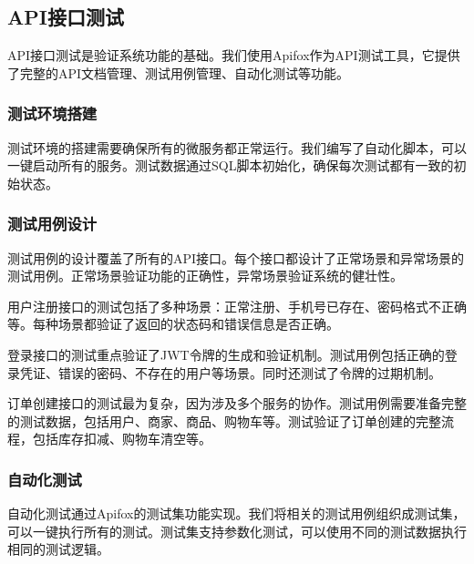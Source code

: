\documentclass[a4paper,12pt]{article}
\begin{document}
\subsection{API接口测试}

API接口测试是验证系统功能的基础。我们使用Apifox作为API测试工具，它提供了完整的API文档管理、测试用例管理、自动化测试等功能。

\subsubsection{测试环境搭建}

测试环境的搭建需要确保所有的微服务都正常运行。我们编写了自动化脚本，可以一键启动所有的服务。测试数据通过SQL脚本初始化，确保每次测试都有一致的初始状态。

\subsubsection{测试用例设计}

测试用例的设计覆盖了所有的API接口。每个接口都设计了正常场景和异常场景的测试用例。正常场景验证功能的正确性，异常场景验证系统的健壮性。

\begin{center}
\end{center}

用户注册接口的测试包括了多种场景：正常注册、手机号已存在、密码格式不正确等。每种场景都验证了返回的状态码和错误信息是否正确。

登录接口的测试重点验证了JWT令牌的生成和验证机制。测试用例包括正确的登录凭证、错误的密码、不存在的用户等场景。同时还测试了令牌的过期机制。

订单创建接口的测试最为复杂，因为涉及多个服务的协作。测试用例需要准备完整的测试数据，包括用户、商家、商品、购物车等。测试验证了订单创建的完整流程，包括库存扣减、购物车清空等。

\subsubsection{自动化测试}

自动化测试通过Apifox的测试集功能实现。我们将相关的测试用例组织成测试集，可以一键执行所有的测试。测试集支持参数化测试，可以使用不同的测试数据执行相同的测试逻辑。
\end{document}
